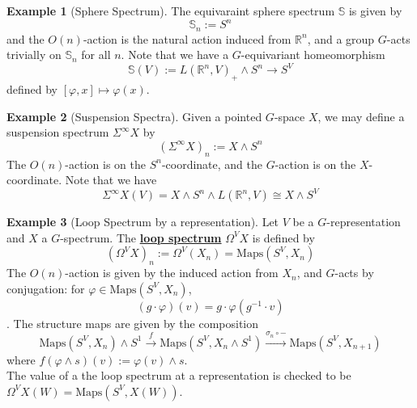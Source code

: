 \documentclass{article}
\theoremstyle{definition}
\theoremstyle{definition}
\theoremstyle{definition}
\theoremstyle{definition}
\theoremstyle{definition}
\theoremstyle{definition}
\theoremstyle{definition}
\newtheorem{example}{Example}[theorem]
\begin{document}
\begin{tcolorbox}[colback=yellow!5!white,colframe=yellow!30!white]
\begin{example}[Sphere Spectrum]
    The equivaraint sphere spectrum $\mathbb{S}$ is given by 
    \[\mathbb{S}_n:=S^n\]
    and the $O(n)$-action is the natural action induced from $\mathbb{R}^n$, and a group $G$-acts trivially on $\mathbb{S}_n$ for all $n$. Note that we have a $G$-equivariant homeomorphism 
    \[\mathbb{S}(V):=L(\mathbb{R}^n, V)_+\wedge S^n\to S^V\]
    defined by $[\varphi, x]\mapsto \varphi(x)$.
    
\end{example}
\end{tcolorbox}


\begin{tcolorbox}[colback=yellow!5!white,colframe=yellow!30!white]
\begin{example}[Suspension Spectra]
    Given a pointed $G$-space $X$, we may define a suspension spectrum $\Sigma^{\infty}X$ by 
    \[(\Sigma^{\infty}X)_n:=X\wedge S^n\]
    The $O(n)$-action is on the $S^n$-coordinate, and the $G$-action is on the $X$-coordinate. Note that we have 
    \[\Sigma^{\infty}X(V)=X\wedge S^n\wedge L(\mathbb{R}^n,V)\cong X\wedge S^V\]
\end{example}
\end{tcolorbox}


\begin{tcolorbox}[colback=yellow!5!white,colframe=yellow!30!white]
\begin{example}[Loop Spectrum by a representation]
    Let $V$ be a $G$-representation and $X$ a $G$-spectrum. The \underline{\textbf{loop spectrum}} $\Omega^VX$ is defined by 
    \[(\Omega^VX)_n:=\Omega^V(X_n)=\textrm{Maps}(S^V,X_n)\]
    The $O(n)$-action is given by the induced action from $X_n$, and $G$-acts by conjugation: for $\varphi\in \textrm{Maps}(S^V,X_n)$,
    \[(g\cdot \varphi)(v)=g\cdot \varphi(g^{-1}\cdot v)\]. The structure maps are given by the composition 
    \[\textrm{Maps}(S^V,X_n)\wedge S^1 \xrightarrow{f}\textrm{Maps}(S^V,X_n\wedge S^1)\xrightarrow{\sigma_n\circ -}\textrm{Maps}(S^V,X_{n+1})\]
    where $f(\varphi\wedge s)(v):=\varphi(v)\wedge s$.\\ 
    

    The value of a the loop spectrum at a representation is checked to be $\Omega^VX(W)=\textrm{Maps}(S^V, X(W))$.
\end{example}
\end{tcolorbox}
\end{document}
